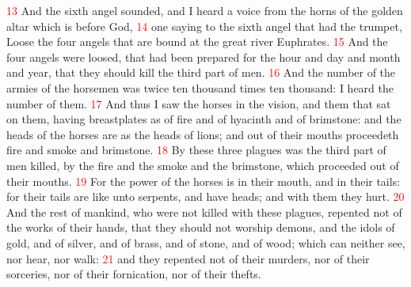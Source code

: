 \documentclass[12pt,twoside]{memoir}
\newcommand{\vnum}[1]{\textcolor{red}{\normalsize{#1}}}
\begin{document}
\vnum{13} And the sixth angel sounded, and I heard a voice from the horns of the golden altar which is before God, 
\vnum{14} one saying to the sixth angel that had the trumpet, Loose the four angels that are bound at the great river Euphrates. 
\vnum{15} And the four angels were loosed, that had been prepared for the hour and day and month and year, that they should kill the third part of men. 
\vnum{16} And the number of the armies of the horsemen was twice ten thousand times ten thousand: I heard the number of them. 
\vnum{17} And thus I saw the horses in the vision, and them that sat on them, having breastplates as of fire and of hyacinth and of brimstone: and the heads of the horses are as the heads of lions; and out of their mouths proceedeth fire and smoke and brimstone. 
\vnum{18} By these three plagues was the third part of men killed, by the fire and the smoke and the brimstone, which proceeded out of their mouths. 
\vnum{19} For the power of the horses is in their mouth, and in their tails: for their tails are like unto serpents, and have heads; and with them they hurt. 
\vnum{20} And the rest of mankind, who were not killed with these plagues, repented not of the works of their hands, that they should not worship demons, and the idols of gold, and of silver, and of brass, and of stone, and of wood; which can neither see, nor hear, nor walk: 
\vnum{21} and they repented not of their murders, nor of their sorceries, nor of their fornication, nor of their thefts.

\end{document}
